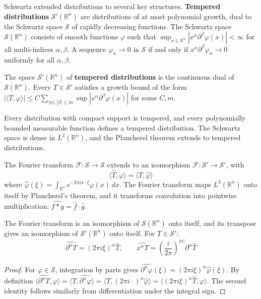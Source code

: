 Schwartz extended distributions to several key structures. \textbf{Tempered distributions} $\mathcal{S}'(\mathbb{R}^n)$ are distributions of at most polynomial growth, dual to the Schwartz space $\mathcal{S}$ of rapidly decreasing functions. The Schwartz space $\mathcal{S}(\mathbb{R}^n)$ consists of smooth functions $\varphi$ such that $\sup_{x \in \mathbb{R}^n} |x^\alpha \partial^\beta \varphi(x)| < \infty$ for all multi-indices $\alpha, \beta$. A sequence $\varphi_n \to 0$ in $\mathcal{S}$ if and only if $x^\alpha \partial^\beta \varphi_n \to 0$ uniformly for all $\alpha, \beta$.

\begin{definition}
The space $\mathcal{S}'(\mathbb{R}^n)$ of \textbf{tempered distributions} is the continuous dual of $\mathcal{S}(\mathbb{R}^n)$. Every $T \in \mathcal{S}'$ satisfies a growth bound of the form $|\langle T, \varphi \rangle| \leq C \sum_{|\alpha|,|\beta| \leq m} \sup |x^\alpha \partial^\beta \varphi(x)|$ for some $C, m$.
\end{definition}

Every distribution with compact support is tempered, and every polynomially bounded measurable function defines a tempered distribution. The Schwartz space is dense in $L^2(\mathbb{R}^n)$, and the Plancherel theorem extends to tempered distributions.

The Fourier transform $\mathcal{F}: \mathcal{S} \to \mathcal{S}$ extends to an isomorphism $\mathcal{F}: \mathcal{S}' \to \mathcal{S}'$, with
\[\langle \hat{T}, \varphi \rangle = \langle T, \hat{\varphi} \rangle\]
where $\hat{\varphi}(\xi) = \int_{\mathbb{R}^n} e^{-2\pi i x \cdot \xi} \varphi(x) \, dx$. The Fourier transform maps $L^2(\mathbb{R}^n)$ onto itself by Plancherel's theorem, and it transforms convolution into pointwise multiplication: $\widehat{f * g} = \hat{f} \cdot \hat{g}$.

\begin{theorem}\label{thm:fourier_tempered}
The Fourier transform is an isomorphism of $\mathcal{S}(\mathbb{R}^n)$ onto itself, and its transpose gives an isomorphism of $\mathcal{S}'(\mathbb{R}^n)$ onto itself. For $T \in \mathcal{S}'$:
\[\widehat{\partial^\alpha T} = (2\pi i \xi)^\alpha \hat{T}, \qquad \widehat{x^\alpha T} = \left(\frac{i}{2\pi}\right)^{|\alpha|} \partial^\alpha \hat{T}\]
\end{theorem}

\begin{proof}
For $\varphi \in \mathcal{S}$, integration by parts gives $\widehat{\partial^\alpha \varphi}(\xi) = (2\pi i \xi)^\alpha \hat{\varphi}(\xi)$. By definition $\langle \widehat{\partial^\alpha T}, \varphi \rangle = \langle T, \widehat{\partial^\alpha \varphi} \rangle = \langle T, (2\pi i \cdot)^\alpha \hat{\varphi} \rangle = \langle (2\pi i \xi)^\alpha \hat{T}, \varphi \rangle$. The second identity follows similarly from differentiation under the integral sign.
\end{proof}

